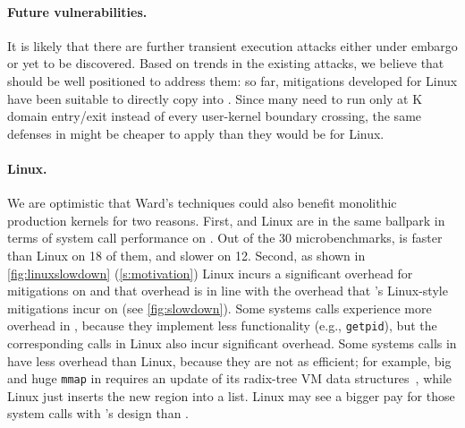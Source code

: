 \label{s:discussion}

\paragraph{Future vulnerabilities.}

It is likely that there are further transient
execution attacks either under embargo or yet to be discovered. Based on trends
in the existing attacks, we believe that \sys should be well positioned to
address them: so far, mitigations developed for Linux have been suitable to
directly copy into \sys. Since many need to run only at K domain entry/exit
instead of every user-kernel boundary crossing, the same defenses in \sys
might be cheaper to apply than they would be for Linux.

\paragraph{Linux.}


We are optimistic that Ward's techniques could also benefit monolithic
production kernels for two reasons.
First, \sys and Linux are in the same ballpark in terms of system call
performance on \bench.  Out of the 30 microbenchmarks, \sys is faster than
Linux on 18 of them, and slower on 12.
Second, as shown in \autoref{fig:linuxslowdown} (\autoref{s:motivation})
Linux incurs a significant overhead for mitigations on \bench and that
overhead is in line with the overhead that \sys's Linux-style mitigations
incur on \bench (see
\autoref{fig:slowdown}).  Some systems calls experience more overhead in
\sys, because they implement less functionality (e.g., \texttt{getpid}),
but the corresponding calls in Linux also incur significant overhead.
Some systems calls in \sys have less overhead than Linux, because they are
not as efficient; for example, big and huge \texttt{mmap} in \sys requires
an update of its radix-tree VM data structures~\cite{clements:radixvm},
while Linux just inserts the new region into a list. Linux may see a
bigger pay for those system calls with \sys's design than \sys.

